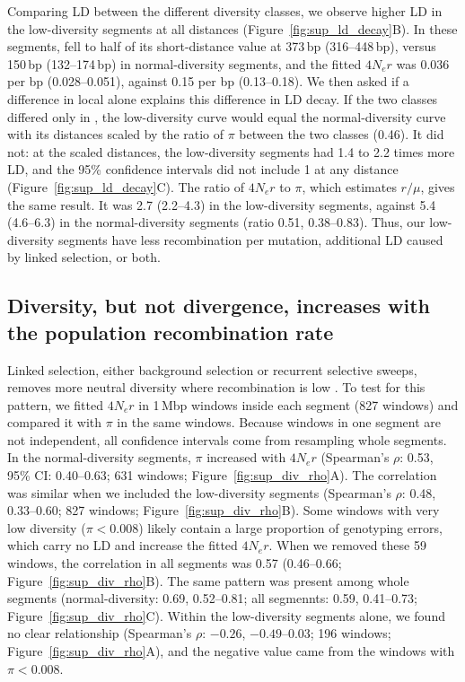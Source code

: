 Comparing LD between the different diversity classes, we observe higher
LD in the low-diversity segments at all distances (Figure~\ref{fig:sup_ld_decay}B).
In these segments, \sdsq{} fell to half of its short-distance value at
373\,bp (316--448\,bp), versus 150\,bp (132--174\,bp) in normal-diversity segments, and the
fitted $4N_{e}r$ was 0.036 per bp (0.028--0.051), against 0.15 per bp (0.13--0.18).
We then asked if a difference in local \Ne{} alone explains this difference in LD decay.
If the two classes differed only in \Ne{}, the low-diversity curve would equal the
normal-diversity curve with its distances scaled by the ratio of $\pi$ between the
two classes (0.46).
It did not: at the scaled distances, the low-diversity segments had 1.4 to 2.2 times
more LD, and the 95\% confidence intervals did not include 1 at any distance
(Figure~\ref{fig:sup_ld_decay}C).
The ratio of $4N_{e}r$ to $\pi$, which estimates $r/\mu$, gives the same result.
It was 2.7 (2.2--4.3) in the low-diversity segments, against 5.4 (4.6--6.3) in the
normal-diversity segments (ratio 0.51, 0.38--0.83).
Thus, our low-diversity segments have less recombination per mutation, additional LD
caused by linked selection, or both.

\subsection*{Diversity, but not divergence, increases with the population recombination rate}\label{sec:results_pi_rho}

Linked selection, either background selection or recurrent
selective sweeps, removes more neutral diversity where recombination is low
\citep{kaplan_hitchhiking_1989,begun_levels_1992,charlesworth_effect_1993}.
To test for this pattern, we fitted $4N_{e}r$ in 1\,Mbp windows inside each segment
(827 windows) and compared it with $\pi$ in the same windows.
Because windows in one segment are not independent, all confidence intervals come
from resampling whole segments.
In the normal-diversity segments, $\pi$ increased with $4N_{e}r$ (Spearman's $\rho$:
0.53, 95\% CI: 0.40--0.63; 631 windows; Figure~\ref{fig:sup_div_rho}A).
The correlation was similar when we included the low-diversity segments
(Spearman's $\rho$: 0.48, 0.33--0.60; 827 windows; Figure~\ref{fig:sup_div_rho}B).
Some windows with very low diversity ($\pi < 0.008$) likely contain a large proportion of
genotyping errors, which carry no LD and increase the fitted $4N_{e}r$.
When we removed these 59 windows, the correlation in all segments was 0.57
(0.46--0.66; Figure~\ref{fig:sup_div_rho}B).
The same pattern was present among whole segments (normal-diversity: 0.69, 0.52--0.81;
all segmennts: 0.59, 0.41--0.73; Figure~\ref{fig:sup_div_rho}C).
Within the low-diversity segments alone, we found no clear relationship
(Spearman's $\rho$: $-0.26$, $-0.49$--0.03; 196 windows; Figure~\ref{fig:sup_div_rho}A),
and the negative value came from the windows with $\pi < 0.008$.
\vspace{0.1cm}

